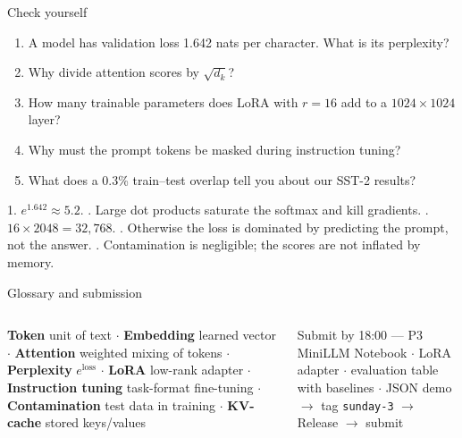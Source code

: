 \documentclass[aspectratio=169,11pt]{beamer}
\begin{document}
\begin{frame}{Check yourself}
\begin{enumerate}
\item A model has validation loss 1.642 nats per character. What is its perplexity?
\item Why divide attention scores by $\sqrt{d_k}$?
\item How many trainable parameters does LoRA with $r=16$ add to a $1024\times1024$ layer?
\item Why must the prompt tokens be masked during instruction tuning?
\item What does a 0.3\% train--test overlap tell you about our SST-2 results?
\end{enumerate}
\begin{bex}[Answers]
1. $e^{1.642}\approx5.2$. . Large dot products saturate the softmax and kill gradients. . $16\times2048=32{,}768$. . Otherwise the loss is dominated by predicting the prompt, not the answer. . Contamination is negligible; the scores are not inflated by memory.
\end{bex}
\end{frame}

\begin{frame}{Glossary and submission}
\begin{columns}[T]
\begin{bdef}[Glossary]
\textbf{Token} unit of text $\cdot$ \textbf{Embedding} learned vector $\cdot$ \textbf{Attention} weighted mixing of tokens $\cdot$ \textbf{Perplexity} $e^{\text{loss}}$ $\cdot$ \textbf{LoRA} low-rank adapter $\cdot$ \textbf{Instruction tuning} task-format fine-tuning $\cdot$ \textbf{Contamination} test data in training $\cdot$ \textbf{KV-cache} stored keys/values
\end{bdef}
\begin{block}{Submit by 18:00 --- P3 MiniLLM}
Notebook $\cdot$ LoRA adapter $\cdot$ evaluation table with baselines $\cdot$ JSON demo $\rightarrow$ tag \texttt{sunday-3} $\rightarrow$ Release $\rightarrow$ submit
\end{block}
\end{columns}
\end{frame}
\end{document}
